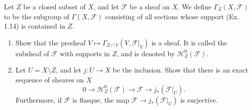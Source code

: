\begin{exercise}%
	Let $Z $ be a closed subset of $X $, and let $\mathscr{F}$ be a sheaf on $X $. We define $\Gamma_Z(X,\mathscr{F}) $ to be the subgroup of $\Gamma(X,\mathscr{F}) $ consisting of all sections whose support (Ex. 1.14) is contained in $Z $.
	\begin{enumerate}
		\item Show that the presheaf $V\mapsto \Gamma_{Z\cap V}(V,\mathscr{F}|_V) $ is a sheaf. It is called the subsheaf of $\mathscr{F} $ with supports in $Z $, and is denoted by $\mathscr{H}_Z^0(\mathscr{F}) $.
		\item Let $U = X \setminus Z $, and let $j: U\to X $ be the inclusion. Show that there is an exact sequence of sheaves on $X $
			\[
				0 \to \mathscr{H}_Z^0(\mathscr{F}) \to \mathscr{F} \to j_\ast(\mathscr{F}|_U)
			.\]
			Furthermore, if $\mathscr{F} $ is flasque, the map $\mathscr{F}\to j_\ast(\mathscr{F}|_U) $ is surjective.
	\end{enumerate}
\end{exercise}
